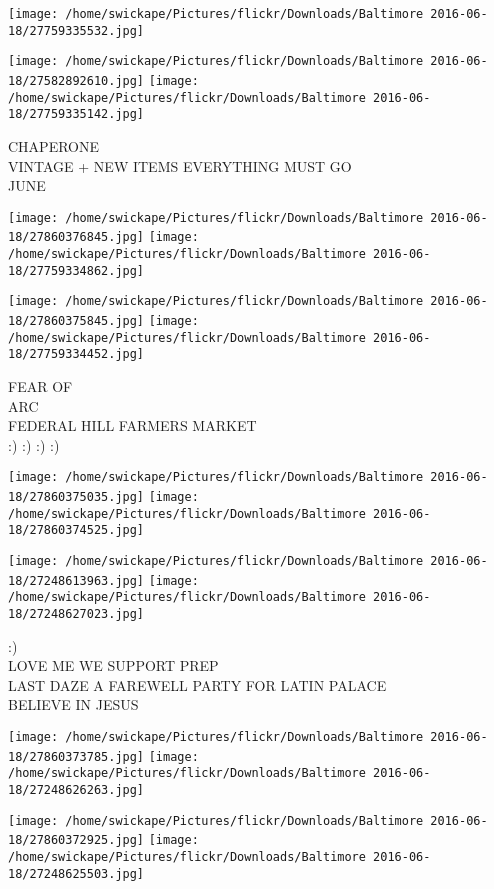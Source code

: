 \documentclass[10pt,letterpaper]{article}
\begin{document}
\texttt{[image: /home/swickape/Pictures/flickr/Downloads/Baltimore 2016-06-18/27759335532.jpg]}

\vspace{0.25in}
\texttt{[image: /home/swickape/Pictures/flickr/Downloads/Baltimore 2016-06-18/27582892610.jpg]}
\texttt{[image: /home/swickape/Pictures/flickr/Downloads/Baltimore 2016-06-18/27759335142.jpg]}

CHAPERONE\\
VINTAGE + NEW ITEMS EVERYTHING MUST GO\\
JUNE
\pagebreak

\texttt{[image: /home/swickape/Pictures/flickr/Downloads/Baltimore 2016-06-18/27860376845.jpg]}
\texttt{[image: /home/swickape/Pictures/flickr/Downloads/Baltimore 2016-06-18/27759334862.jpg]}

\texttt{[image: /home/swickape/Pictures/flickr/Downloads/Baltimore 2016-06-18/27860375845.jpg]}
\texttt{[image: /home/swickape/Pictures/flickr/Downloads/Baltimore 2016-06-18/27759334452.jpg]}

FEAR OF\\
ARC\\
FEDERAL HILL FARMERS MARKET\\
:) :) :) :)
\pagebreak

\texttt{[image: /home/swickape/Pictures/flickr/Downloads/Baltimore 2016-06-18/27860375035.jpg]}
\texttt{[image: /home/swickape/Pictures/flickr/Downloads/Baltimore 2016-06-18/27860374525.jpg]}

\texttt{[image: /home/swickape/Pictures/flickr/Downloads/Baltimore 2016-06-18/27248613963.jpg]}
\texttt{[image: /home/swickape/Pictures/flickr/Downloads/Baltimore 2016-06-18/27248627023.jpg]}

:)\\
LOVE ME WE SUPPORT PREP\\
LAST DAZE A FAREWELL PARTY FOR LATIN PALACE\\
BELIEVE IN JESUS
\pagebreak

\texttt{[image: /home/swickape/Pictures/flickr/Downloads/Baltimore 2016-06-18/27860373785.jpg]}
\texttt{[image: /home/swickape/Pictures/flickr/Downloads/Baltimore 2016-06-18/27248626263.jpg]}

\texttt{[image: /home/swickape/Pictures/flickr/Downloads/Baltimore 2016-06-18/27860372925.jpg]}
\texttt{[image: /home/swickape/Pictures/flickr/Downloads/Baltimore 2016-06-18/27248625503.jpg]}
\end{document}
